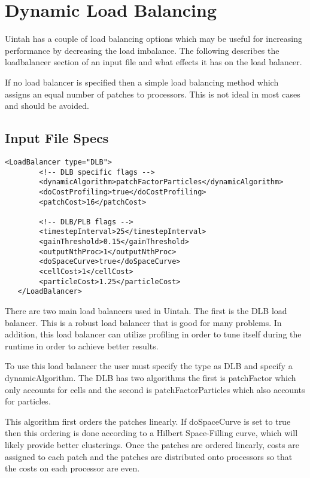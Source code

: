 \section{Dynamic Load Balancing}

Uintah has a couple of load balancing options which may be useful for increasing performance by decreasing
the load imbalance.  The following describes the loadbalancer section of an input file and what effects
it has on the load balancer.  

If no load balancer is specified then a simple load balancing method which assigns an equal number of patches
to processors. This is not ideal in most cases and should be avoided.

\subsection{Input File Specs}
\begin{Verbatim}[fontsize=\footnotesize]
   <LoadBalancer type="DLB"> 
        <!-- DLB specific flags -->
        <dynamicAlgorithm>patchFactorParticles</dynamicAlgorithm>
        <doCostProfiling>true</doCostProfiling>
        <patchCost>16</patchCost>

        <!-- DLB/PLB flags -->
        <timestepInterval>25</timestepInterval>
        <gainThreshold>0.15</gainThreshold>
        <outputNthProc>1</outputNthProc>
        <doSpaceCurve>true</doSpaceCurve>
        <cellCost>1</cellCost>
        <particleCost>1.25</particleCost>
   </LoadBalancer>
\end{Verbatim}

There are two main load balancers used in Uintah.  The first is the DLB load balancer.
This is a robust load balancer that is good for many problems.  In addition,
this load balancer can utilize profiling in order to tune itself during the runtime
in order to achieve better results.  

To use this load balancer the user must specify the type as DLB and specify
a dynamicAlgorithm.  The DLB has two algorithms the first is patchFactor which
only accounts for cells and the second is patchFactorParticles which also accounts
for particles.    

This algorithm first orders the patches linearly.  If doSpaceCurve is set to true
then this ordering is done according to a Hilbert Space-Filling curve, which will
likely provide better clusterings.  Once the patches are ordered linearly, costs
are assigned to each patch and the patches are distributed onto processors so that
the costs on each processor are even.  

